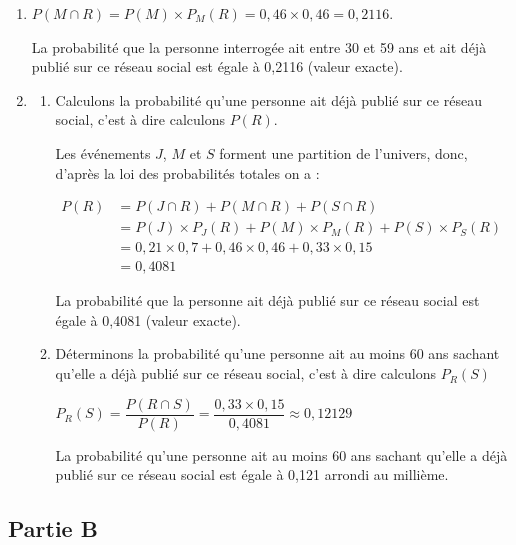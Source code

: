 \documentclass[10pt]{article}
\begin{document}
\begin{enumerate}
	\item  $P(M \cap R)= P(M) \times P_M(R)= 0,46 \times 0,46 = 0,2116$.

	La probabilité que la personne interrogée ait entre 30 et 59 ans et ait déjà publié sur ce réseau social est égale à 0,2116 (valeur exacte).



	\item

	\begin{enumerate}
		\item Calculons la probabilité qu'une personne ait déjà publié sur ce réseau social, c'est à dire calculons $P(R)$.

		Les événements $J$, $M$ et $S$ forment une partition de l'univers, donc, d'après la loi des probabilités totales on a :

		$\begin{aligned}
			P(R) & = P(J \cap R) + P(M \cap R) + P(S \cap R) \\
			&= P(J) \times P_J(R) + P(M) \times P_M(R) + P(S) \times P_S(R) \\
			&= 0,21 \times 0,7 + 0,46 \times 0,46 + 0,33 \times 0,15 \\
			&= 0,4081
		\end{aligned}$

		La probabilité que la personne ait déjà publié sur ce réseau social est égale à 0,4081 (valeur exacte).

		\item Déterminons la probabilité qu'une personne ait au moins 60 ans sachant qu'elle a déjà publié sur ce réseau social, c'est à dire calculons $P_R(S)$

		$P_R(S)= \dfrac{P(R\cap S)}{P(R)}= \dfrac{0,33 \times 0,15}{0,4081} \approx 0,12129$

		La probabilité qu'une personne ait au moins 60 ans sachant qu'elle a déjà publié sur ce réseau social est égale à 0,121 arrondi au millième.
	\end{enumerate}
\end{enumerate}

\subsection*{Partie B}
\end{document}
